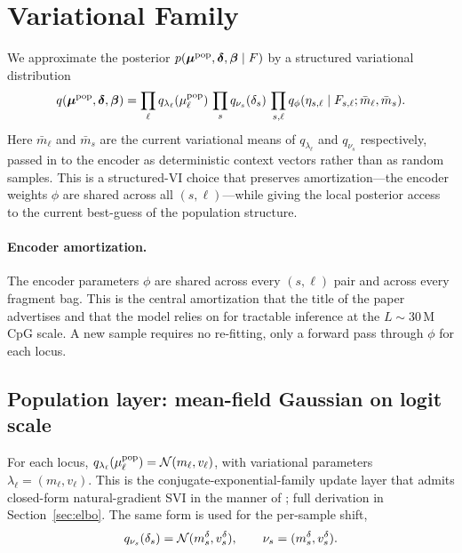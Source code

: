 \section{Variational Family}
\label{sec:varfamily}

We approximate the posterior $p(\bm{\mu}^{\mathrm{pop}},\boldsymbol{\delta},\boldsymbol{\beta}\mid F)$ by a structured variational distribution
\begin{equation}
q(\bm{\mu}^{\mathrm{pop}},\boldsymbol{\delta},\boldsymbol{\beta}) = \prod_\ell q_{\lambda_\ell}(\mu^{\mathrm{pop}}_\ell)\,\prod_s q_{\nu_s}(\delta_s)\,\prod_{s,\ell} q_\phi(\eta_{s,\ell}\mid F_{s,\ell}; \bar m_\ell, \bar m_s).
\label{eq:varfamily}
\end{equation}
Here $\bar m_\ell$ and $\bar m_s$ are the current variational means of $q_{\lambda_\ell}$ and $q_{\nu_s}$ respectively, passed in to the encoder as deterministic context vectors rather than as random samples. This is a structured-VI choice that preserves amortization—the encoder weights $\phi$ are shared across all $(s,\ell)$—while giving the local posterior access to the current best-guess of the population structure.

\paragraph{Encoder amortization.} The encoder parameters $\phi$ are shared across every $(s,\ell)$ pair and across every fragment bag. This is the central amortization that the title of the paper advertises and that the model relies on for tractable inference at the $L\sim 30\,\text{M}$ CpG scale. A new sample requires no re-fitting, only a forward pass through $\phi$ for each locus.

\subsection{Population layer: mean-field Gaussian on logit scale}
For each locus, $q_{\lambda_\ell}(\mu^{\mathrm{pop}}_\ell)=\mathcal{N}(m_\ell,v_\ell)$, with variational parameters $\lambda_\ell=(m_\ell,v_\ell)$. This is the conjugate-exponential-family update layer that admits closed-form natural-gradient SVI in the manner of \citet{hoffman2013svi}; full derivation in Section~\ref{sec:elbo}. The same form is used for the per-sample shift,
\begin{equation}
q_{\nu_s}(\delta_s)=\mathcal{N}(m_s^\delta,v_s^\delta), \qquad \nu_s=(m_s^\delta,v_s^\delta).
\end{equation}

